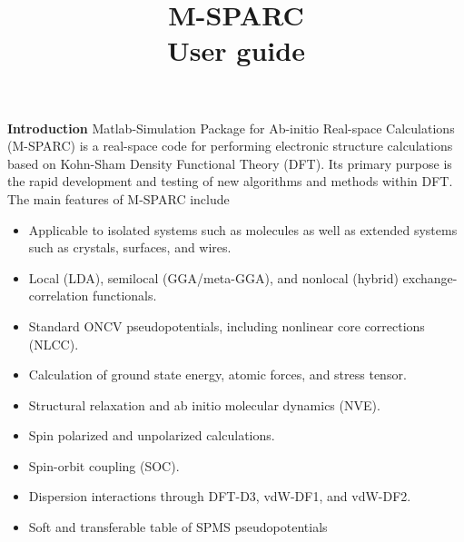 \documentclass[xcolor=dvipsnames,t]{beamer}
\title[] {M-SPARC  \\ {\small User guide}}
\institute[]
{
Material Physics \& Mechanics Group, Georgia Tech \\
PI: Phanish Suryanarayana \\
\hyperlink{Contributors}{\texttt{Contributors}} \\
\hyperlink{Citation}{\texttt{Citation}}\\
\hyperlink{Acknowledgments}{\texttt{Acknowledgements}}\\
}
\date{}
\let\otp\titlepage
\renewcommand{\titlepage}{\otp\addtocounter{framenumber}{-1}}
\begin{document}

\begin{frame}[plain]
 \titlepage
\end{frame}


\begin{frame}[allowframebreaks]{\textbf{Introduction}} \label{Introduction}
Matlab-Simulation Package for Ab-initio Real-space Calculations (M-SPARC) is a real-space code for performing electronic structure calculations based on Kohn-Sham Density Functional Theory (DFT). Its primary purpose is the rapid development and testing of new algorithms and methods within DFT. The main features of M-SPARC include
\begin{itemize}
  \item Applicable to isolated systems such as molecules as well as extended systems such as crystals, surfaces, and wires.
  \item Local (LDA), semilocal (GGA/meta-GGA), and nonlocal (hybrid) exchange-correlation functionals.
  \item Standard ONCV pseudopotentials, including nonlinear core corrections (NLCC).
  \item Calculation of ground state energy, atomic forces, and stress tensor.
  \item Structural relaxation and ab initio molecular dynamics (NVE).
  \item Spin polarized and unpolarized calculations.
  \item Spin-orbit coupling (SOC).
  \item Dispersion interactions through DFT-D3, vdW-DF1, and vdW-DF2.
  \item Soft and transferable table of SPMS pseudopotentials
\end{itemize}

\end{frame}
\end{document}
